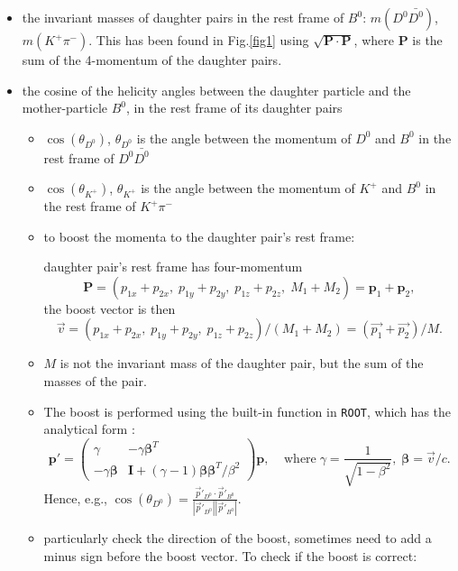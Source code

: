 \begin{itemize}
    \item the invariant masses of daughter pairs in the rest frame of $B^0$: $m(D^0\bar{D^0})$, $m(K^+\pi^-)$. This has been found in Fig.\ref{fig1} using $\sqrt{\bm{P}\cdot\bm{P}}$, where $\bm{P}$ is the sum of the 4-momentum of the daughter pairs.
    \item the cosine of the helicity angles between the daughter particle and the mother-particle $B^0$, in the rest frame of its daughter pairs
    \begin{itemize}
        \item $\cos(\theta_{D^0})$, $\theta_{D^0}$ is the angle between the momentum of $D^0$ and $B^0$ in the rest frame of $D^0\bar{D^0}$
        \item $\cos(\theta_{K^+})$, $\theta_{K^+}$ is the angle between the momentum of $K^+$ and $B^0$ in the rest frame of $K^+\pi^-$
        \item to boost the momenta to the daughter pair's rest frame:
        
        daughter pair's rest frame has four-momentum
        \begin{equation}
            \bm{P} = (p_{1x} + p_{2x} ,\;p_{1y} + p_{2y},\;p_{1z} + p_{2z},\;M_1 + M_2) = \bm{p}_1 + \bm{p}_2,
        \end{equation}
        the boost vector is then
        \begin{equation}
            \Vec{v} = (p_{1x} + p_{2x} ,\;p_{1y} + p_{2y},\;p_{1z} + p_{2z})/(M_1 + M_2) = (\Vec{p_1}+\Vec{p_2})/M.
        \end{equation}
        \item $M$ is not the invariant mass of the daughter pair, but the sum of the masses of the pair.
        \item The boost is performed using the built-in function in \texttt{ROOT}, which has the analytical form \autocite{wiki:xxx}:
        \begin{equation}
        \bm{p}'=\left(
         \begin{matrix}
         \gamma & -\gamma\bm{\beta}^{T}\\
         -\gamma\bm{\beta} & \bm{I}+(\gamma-1)\bm{\beta}\bm{\beta}^{T}/\beta^2 
         \end{matrix}
         \right)\bm{p},\;\;\;\;\text{where}\;\gamma=\frac{1}{\sqrt{1-\beta^2}},\;\bm{\beta} = \Vec{v}/c.
        \end{equation}
        Hence, e.g., $\cos(\theta_{D^0}) = \frac{\Vec{p}'_{D^0}\cdot\Vec{p}'_{B^0}}{|\Vec{p}'_{D^0}||\Vec{p}'_{B^0}|}$.
        \item particularly check the direction of the boost, sometimes need to add a minus sign before the boost vector. To check if the boost is correct:
        

\end{itemize}
\end{itemize}

